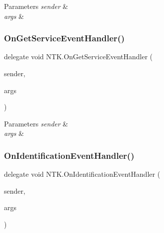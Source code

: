 \begin{DoxyParams}{Parameters}
{\em sender} & \\
\hline
{\em args} & \\
\hline
\end{DoxyParams}
\mbox{\label{namespace_n_t_k_af8c7a0dee9d2b4d395e6d806229d2d4f}} 
\subsubsection{\texorpdfstring{OnGetServiceEventHandler()}{OnGetServiceEventHandler()}}
{\footnotesize\ttfamily delegate void N\+T\+K.\+On\+Get\+Service\+Event\+Handler (\begin{DoxyParamCaption}\item[{object}]{sender,  }\item[{\mbox{\hyperlink{class_n_t_k_1_1_events_args_1_1_get_service_event_args}{Get\+Service\+Event\+Args}}}]{args }\end{DoxyParamCaption})}






\begin{DoxyParams}{Parameters}
{\em sender} & \\
\hline
{\em args} & \\
\hline
\end{DoxyParams}
\mbox{\label{namespace_n_t_k_a7691450f3d18d3bd04ffaf0a7b564b52}} 
\subsubsection{\texorpdfstring{OnIdentificationEventHandler()}{OnIdentificationEventHandler()}}
{\footnotesize\ttfamily delegate void N\+T\+K.\+On\+Identification\+Event\+Handler (\begin{DoxyParamCaption}\item[{object}]{sender,  }\item[{\mbox{\hyperlink{class_n_t_k_1_1_events_args_1_1_identification_event_args}{Identification\+Event\+Args}}}]{args }\end{DoxyParamCaption})}






